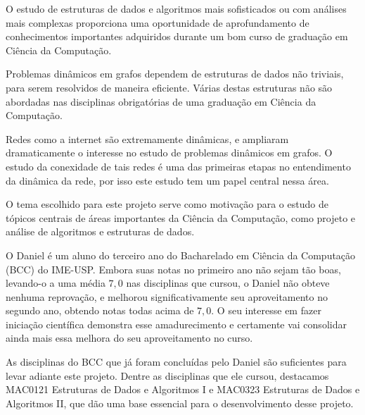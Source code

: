 O estudo de estruturas de dados e algoritmos mais sofisticados ou com análises
mais complexas proporciona uma oportunidade de aprofundamento de conhecimentos 
importantes adquiridos durante um bom curso de graduação em Ciência da Computação.

Problemas dinâmicos em grafos dependem de estruturas de dados não triviais, para 
serem resolvidos de maneira eficiente.  Várias destas estruturas não são abordadas 
nas disciplinas obrigatórias de uma graduação em Ciência da Computação. 

Redes como a internet são extremamente dinâmicas, e ampliaram dramaticamente o 
interesse no estudo de problemas dinâmicos em grafos.  O estudo da conexidade 
de tais redes é uma das primeiras etapas no entendimento da dinâmica da rede, 
por isso este estudo tem um papel central nessa área. 

O tema escolhido para este projeto serve como motivação para o estudo de tópicos 
centrais de áreas importantes da Ciência da Computação, como projeto e análise 
de algoritmos e estruturas de dados. 



O Daniel é um aluno do terceiro ano do Bacharelado em Ciência da Computação (BCC) 
do IME-USP. Embora suas notas no primeiro ano não sejam tão boas, levando-o a 
uma média $7{,}0$ nas disciplinas que cursou, o Daniel não obteve nenhuma reprovação, 
e melhorou significativamente seu aproveitamento no segundo ano, obtendo notas todas
acima de $7{,}0$.  O seu interesse em fazer iniciação científica demonstra esse 
amadurecimento e certamente vai consolidar ainda mais essa melhora do seu 
aproveitamento no curso. 

As disciplinas do BCC que já foram concluídas pelo Daniel são sufi\-cien\-tes 
para levar adiante este projeto.  Dentre as disciplinas que ele cursou, 
destacamos {\small\sc MAC0121 Estruturas de Dados e Algoritmos I} e 
{\small\sc MAC0323 Estruturas de Dados e Algoritmos II}, que dão 
uma base essencial para o desenvolvimento desse projeto. 